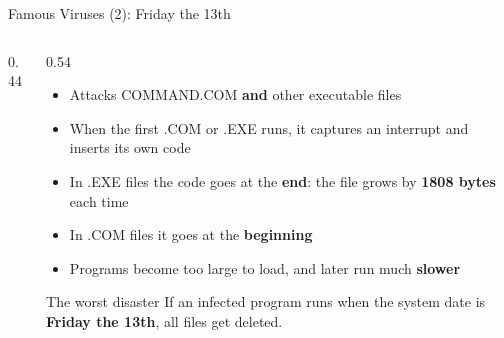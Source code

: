 \documentclass[aspectratio=169,11pt,xcolor={table}]{beamer}
\begin{document}
\begin{frame}{Famous Viruses (2): Friday the 13th}
  \begin{columns}[c]
    \begin{column}{0.44\textwidth}
      \centering
    \end{column}
    \begin{column}{0.54\textwidth}
      \begin{itemize}\small\setlength{\itemsep}{3pt}
        \item Attacks COMMAND.COM \textbf{and} other executable files
        \item When the first .COM or .EXE runs, it captures an interrupt and inserts its own code
        \item In .EXE files the code goes at the \textbf{end}: the file grows by \textbf{1808 bytes} each time
        \item In .COM files it goes at the \textbf{beginning}
        \item Programs become too large to load, and later run much \textbf{slower}
      \end{itemize}
      \begin{alertblock}{The worst disaster}
        \small If an infected program runs when the system date is \textbf{Friday the 13th}, all files get deleted.
      \end{alertblock}
    \end{column}
  \end{columns}
\end{frame}
\end{document}
